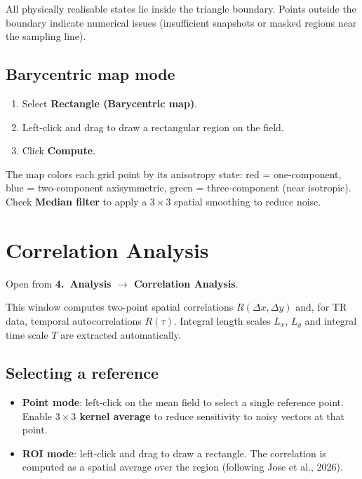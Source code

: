 \documentclass[11pt, a4paper]{report}
\newcommand{\uipth}[1]{\textbf{\textcolor{upblue}{#1}}}
\begin{document}
All physically realisable states lie inside the triangle boundary. Points outside the boundary indicate numerical issues (insufficient snapshots or masked regions near the sampling line).

\section{Barycentric map mode}

\begin{stepbox}
\begin{enumerate}[leftmargin=1.5em, topsep=2pt]
  \item Select \uipth{Rectangle (Barycentric map)}.
  \item Left-click and drag to draw a rectangular region on the field.
  \item Click \uipth{Compute}.
\end{enumerate}
\end{stepbox}

The map colors each grid point by its anisotropy state: red = one-component, blue = two-component axisymmetric, green = three-component (near isotropic). Check \uipth{Median filter} to apply a $3\times3$ spatial smoothing to reduce noise.

\chapter{Correlation Analysis}
\label{ch:correlation}

Open from \uipth{4.\ Analysis $\to$ Correlation Analysis}.

This window computes two-point spatial correlations $R(\Delta x, \Delta y)$ and, for TR data, temporal autocorrelations $R(\tau)$. Integral length scales $L_x$, $L_y$ and integral time scale $T$ are extracted automatically.

\section{Selecting a reference}

\begin{itemize}[leftmargin=1.5em]
  \item \uipth{Point mode}: left-click on the mean field to select a single reference point. Enable \uipth{$3\times3$ kernel average} to reduce sensitivity to noisy vectors at that point.
  \item \uipth{ROI mode}: left-click and drag to draw a rectangle. The correlation is computed as a spatial average over the region (following Jose et al., 2026).
\end{itemize}
\end{document}
